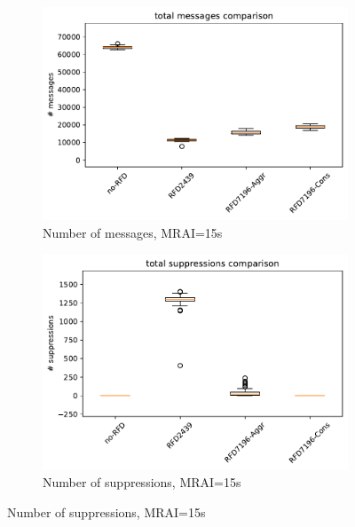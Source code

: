 \begin{figure}[H]
     \hfill
     \begin{subfigure}[b]{0.325\textwidth}
         \centering
         \includegraphics[width=\textwidth]{images/RFD/miceVSelephants/MultiMRAI/15/elephants/cisco_1000MRAI15_rfd_comparison_messages_boxplot.pdf}
         \caption{\scriptsize Number of messages, MRAI=15s}
         \label{fig:1000_RFD_MRAI15_messages_elephant}
     \end{subfigure}
     \hfill
     \begin{subfigure}[b]{0.325\textwidth}
         \centering
         \includegraphics[width=\textwidth]{images/RFD/miceVSelephants/MultiMRAI/15/elephants/cisco_1000MRAI15_rfd_comparison_suppressions_boxplot.pdf}
         \caption{\scriptsize Number of suppressions, MRAI=15s}
         \label{fig:1000_RFD_MRAI15_suppressions_elephant}
     \end{subfigure}

\end{figure}
